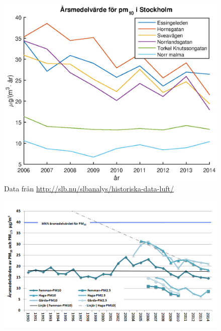 \begin{figure}[H]
	\centering
	\includegraphics[width=.8\textwidth]{Bilder/pm10sth}
	\caption{Data från \url{http://slb.nu/slbanalys/historiska-data-luft/}}
	\label{fig:pm10sth}
\end{figure}

\begin{figure}[H]
	\centering
	\includegraphics[width=.8\textwidth]{Bilder/pm10gbg}
	\caption{\cite{gbg}}
	\label{fig:pm10gbg}
\end{figure}
